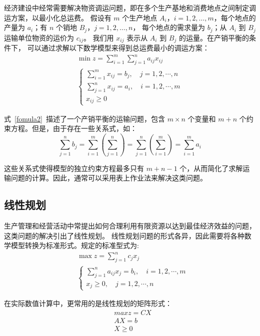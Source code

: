 经济建设中经常需要解决物资调运问题，即在多个生产基地和消费地点之间制定调运方案，以最小化总运费。
假设有 $m$ 个生产地点 $A_i$，$i=1,2,\dots,m$，每个地点的产量为 $a_i$；有 $n$ 个销地 $B_j$，$j=1,2,\dots,n$，
每个地点的需求量为 $b_j$；从 $A_i$ 到 $B_j$ 运输单位物资的运价为 $c_{ij}$。
我们用 $x_{ij}$ 表示从 $A_i$ 到 $B_j$ 的运量。在产销平衡的条件下，
可以通过求解以下数学模型来得到总运费最小的调运方案：
\begin{equation}\label{fomula2}
    \begin{array}{l} 
        \min z=\sum_{i=1}^{m} \sum_{j=1}^{n} a_{i j} x_{i j} \\
        \left\{\begin{array}{l}
        \sum_{i=1}^{m} x_{i j}=b_{j}, \quad j=1,2, \cdots, n \\
        \sum_{j=1}^{n} x_{i j}=a_{i}, \quad i=1,2, \cdots, m \\
        x_{i j} \geqslant 0
        \end{array}\right.
        \end{array}
\end{equation}

式~\ref{fomula2}~描述了一个产销平衡的运输问题，包含 $m \times n$ 个变量和 $m+n$ 个约束方程。但是，由于存在一些关系式，如：
$$\sum_{j=1}^{n} b_j = \sum_{i = 1}^{m} \left ( \sum_{j=1}^{n} \right ) = \sum_{j=1}^{n} \left ( \sum_{i=1}^{m} \right ) = \sum_{i=1}^{m} a_i$$

这些关系式使得模型的独立约束方程最多只有 $m+n-1$ 个，从而简化了求解运输问题的计算。因此，通常可以采用表上作业法来解决这类问题。

\subsection{线性规划}
生产管理和经营活动中常提出如何合理利用有限资源以达到最佳经济效益的问题，这类问题的解决引出了线性规划。
线性规划问题的形式各异，因此需要将各种数学模型转换为标准形式。规定的标准型式为:
$$\begin{aligned}
    & \max z =\sum_{j=1}^{n} c_{j} x_{j} \\
    & \left\{\begin{array}{l}
    \sum_{j=1}^{n} a_{i j} x_{j}=b_{i}, \quad i=1,2, \cdots, m \\
    x_{j} \geqslant 0, \quad j=1,2, \cdots, n
    \end{array}\right.
    \end{aligned}$$

    在实际数值计算中，更常用的是线性规划的矩阵形式：
$$
\begin{aligned}
    &max z=CX \\
    &AX = b\\
    &X \ge 0
\end{aligned}
$$

